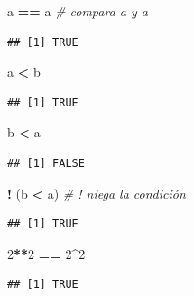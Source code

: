 \documentclass[]{book}
\newenvironment{Shaded}{\begin{snugshade}}{\end{snugshade}}
\newcommand{\CommentTok}[1]{\textcolor[rgb]{0.56,0.35,0.01}{\textit{#1}}}
\newcommand{\DecValTok}[1]{\textcolor[rgb]{0.00,0.00,0.81}{#1}}
\newcommand{\NormalTok}[1]{#1}
\newcommand{\OperatorTok}[1]{\textcolor[rgb]{0.81,0.36,0.00}{\textbf{#1}}}
\newcommand{\StringTok}[1]{\textcolor[rgb]{0.31,0.60,0.02}{#1}}
\begin{document}
\begin{Shaded}
\begin{Highlighting}[]
\NormalTok{a }\OperatorTok{==}\StringTok{ }\NormalTok{a  }\CommentTok{# compara a y a}
\end{Highlighting}
\end{Shaded}

\begin{verbatim}
## [1] TRUE
\end{verbatim}

\begin{Shaded}
\begin{Highlighting}[]
\NormalTok{a }\OperatorTok{<}\StringTok{ }\NormalTok{b}
\end{Highlighting}
\end{Shaded}

\begin{verbatim}
## [1] TRUE
\end{verbatim}

\begin{Shaded}
\begin{Highlighting}[]
\NormalTok{b }\OperatorTok{<}\StringTok{ }\NormalTok{a}
\end{Highlighting}
\end{Shaded}

\begin{verbatim}
## [1] FALSE
\end{verbatim}

\begin{Shaded}
\begin{Highlighting}[]
\OperatorTok{!}\StringTok{ }\NormalTok{(b }\OperatorTok{<}\StringTok{ }\NormalTok{a) }\CommentTok{# ! niega la condición}
\end{Highlighting}
\end{Shaded}

\begin{verbatim}
## [1] TRUE
\end{verbatim}

\begin{Shaded}
\begin{Highlighting}[]
\DecValTok{2}\OperatorTok{**}\DecValTok{2} \OperatorTok{==}\StringTok{ }\DecValTok{2}\OperatorTok{^}\DecValTok{2}
\end{Highlighting}
\end{Shaded}

\begin{verbatim}
## [1] TRUE
\end{verbatim}
\end{document}
